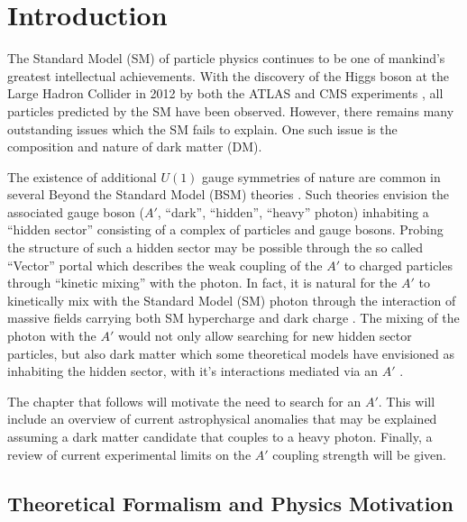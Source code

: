\chapter{Introduction}

The Standard Model (SM) of particle physics continues to be one of mankind's 
greatest intellectual achievements. With the discovery of the Higgs boson at the
Large Hadron Collider in 2012 by both the ATLAS and CMS experiments
\cite{Aad:2012tfa, Chatrchyan:2012xdj}, all particles predicted by the SM have
been observed.  However, there remains many outstanding issues which the SM
fails to explain.  One such issue is the composition and nature of dark matter
(DM).




The existence of additional $U(1)$ gauge symmetries of nature are common in
several Beyond the Standard Model (BSM) theories 
\cite{Goodsell:2010ie, Abel:2008ai, Candelas:1985en, Andreas:2011in, Jaeckel:2010ni}.
Such theories envision the associated gauge boson ($A'$, ``dark'', ``hidden'',
``heavy'' photon) inhabiting a  ``hidden sector'' consisting of a complex of 
particles and gauge bosons.  Probing the structure of such a hidden sector may
be possible through the so called ``Vector'' portal which describes  
the weak coupling of the $A'$ to charged particles through ``kinetic mixing''
with the photon. In fact, it is natural for the $A'$ to 
kinetically mix with the Standard Model (SM) photon through the interaction
of massive fields carrying both SM hypercharge and dark charge \cite{Holdom:1985ag}.
The mixing of the photon with the $A'$ would not only allow searching for
new hidden sector particles, but also dark matter which some theoretical models
have envisioned as inhabiting the hidden sector, with it's interactions mediated
via an $A'$ \cite{ArkaniHamed:2008qn, Pospelov:2008jd, cheung2009, ArkaniHamed:2008qp}.

The chapter that follows will motivate the need to search for an $A'$.  
This will include an overview of current astrophysical anomalies
that may be explained assuming a dark matter candidate that couples to a 
heavy photon.  Finally, a review of current experimental limits on the $A'$ 
coupling strength will be given.

\section{Theoretical Formalism and Physics Motivation}

